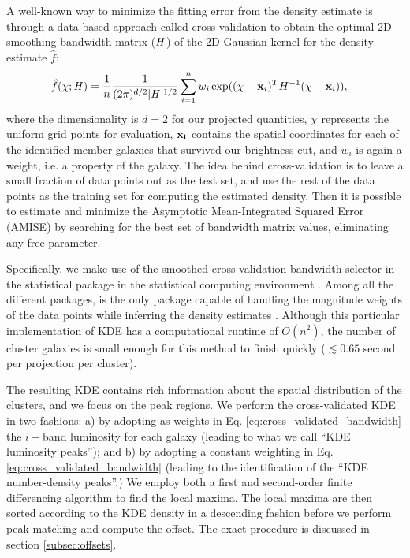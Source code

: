 \documentclass[usenatbib]{mn2e}
\def\Hmat{\mathbf{\it H}}
\begin{document}
{A well-known way to minimize the fitting error from the density estimate is through
a data-based approach called cross-validation to obtain 
the optimal 2D smoothing
bandwidth matrix ($\Hmat$) of the 2D Gaussian kernel for the
density estimate $\hat{f}$:
\begin{align}
	\hat{f}(\chi; \Hmat) &= \frac{1}{n} \frac{1}{(2\pi)^{d/2}|\Hmat|^{1/2}}
	\sum_{i=1}^n w_i \exp((\chi-{\bf x}_i)^T H^{-1} (\chi-{\bf x}_i)),
	\label{eq:cross_validated_bandwidth}
\end{align}
where the dimensionality is $d=2$ for our projected quantities,
$\chi$ represents the uniform grid points for evaluation, 
$\bf{x}_i$ contains the spatial coordinates for each of the identified member 
galaxies that survived our brightness cut, and $w_i$ is again a weight, i.e. a property of the galaxy. 
The idea behind cross-validation is to leave a small fraction of data points 
out as the test set, and use the rest of the data points as 
the training set for computing the estimated density.
Then it is possible to estimate and minimize the Asymptotic Mean-Integrated Squared Error
(AMISE)  by searching
for the best set of bandwidth matrix values, eliminating any free parameter. 

Specifically, we make use of the smoothed-cross validation \citep{Hall1992} 
bandwidth selector in the statistical package {} \citep{Duong2007} 
in the {} statistical computing environment \citep{R_core}. 
Among all the different {} packages, {} is the
only package capable of handling the magnitude weights of the data points 
while inferring the density estimates \citep{Deng2011}. 
Although this particular implementation of KDE has a computational runtime of $O(n^2)$, 
the number of cluster galaxies is
small enough for this method to finish quickly ($\lesssim 0.65$ second per
projection per cluster). 

The resulting KDE contains rich information about the spatial distribution of
the clusters, and we focus on the peak regions. We perform the cross-validated KDE in two fashions: a) by adopting as weights in Eq. \ref{eq:cross_validated_bandwidth} the $i-$band luminosity for each galaxy (leading to what we call ``KDE luminosity peaks''); and b) by adopting a constant weighting in Eq. \ref{eq:cross_validated_bandwidth} (leading to the identification of the ``KDE number-density peaks''.)
We employ both a first and second-order finite differencing algorithm to find the local maxima.  
The local maxima are then sorted according to the KDE density in a descending
fashion before we perform peak matching and compute the offset. The exact
procedure is discussed in section \ref{subsec:offsets}. 


}
\end{document}
